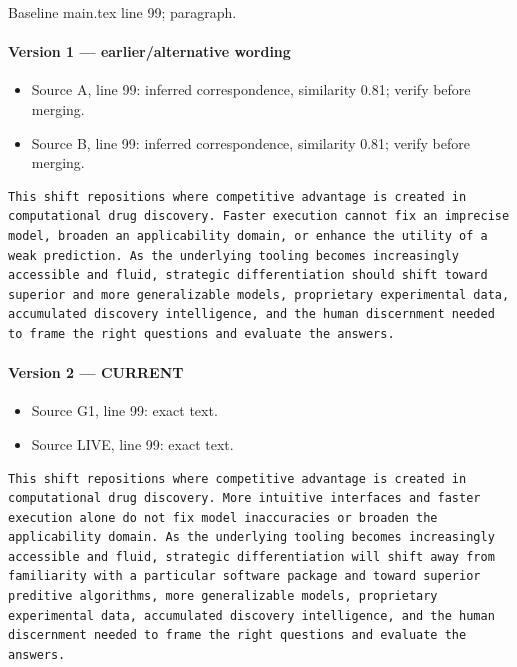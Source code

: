 \documentclass[11pt]{article}
\begin{document}
Baseline main.tex line 99; paragraph.

\paragraph{Version 1 --- earlier/alternative wording}

\begin{itemize}[leftmargin=*]
\item Source A, line 99: inferred correspondence, similarity 0.81; verify before merging.
\item Source B, line 99: inferred correspondence, similarity 0.81; verify before merging.
\end{itemize}

\begin{lstlisting}
This shift repositions where competitive advantage is created in computational drug discovery. Faster execution cannot fix an imprecise model, broaden an applicability domain, or enhance the utility of a weak prediction. As the underlying tooling becomes increasingly accessible and fluid, strategic differentiation should shift toward superior and more generalizable models, proprietary experimental data, accumulated discovery intelligence, and the human discernment needed to frame the right questions and evaluate the answers.
\end{lstlisting}

\paragraph{Version 2 --- CURRENT}

\begin{itemize}[leftmargin=*]
\item Source G1, line 99: exact text.
\item Source LIVE, line 99: exact text.
\end{itemize}

\begin{lstlisting}
This shift repositions where competitive advantage is created in computational drug discovery. More intuitive interfaces and faster execution alone do not fix model inaccuracies or broaden the applicability domain. As the underlying tooling becomes increasingly accessible and fluid, strategic differentiation will shift away from familiarity with a particular software package and toward superior preditive algorithms, more generalizable models, proprietary experimental data, accumulated discovery intelligence, and the human discernment needed to frame the right questions and evaluate the answers.
\end{lstlisting}
\end{document}
